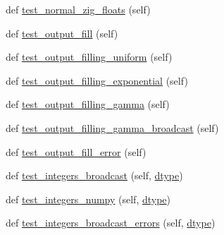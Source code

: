 \begin{DoxyCompactItemize}
\item 
def \hyperlink{classnumpy_1_1random_1_1tests_1_1test__smoke_1_1RNG_a7bd25c1252580282f6c5ece399b0b784}{test\+\_\+normal\+\_\+zig\+\_\+floats} (self)
\item 
def \hyperlink{classnumpy_1_1random_1_1tests_1_1test__smoke_1_1RNG_aa1c3a26ee79d7e545f382d4ed15c1aca}{test\+\_\+output\+\_\+fill} (self)
\item 
def \hyperlink{classnumpy_1_1random_1_1tests_1_1test__smoke_1_1RNG_af3fa4803063d64d41308b6ddb200aaed}{test\+\_\+output\+\_\+filling\+\_\+uniform} (self)
\item 
def \hyperlink{classnumpy_1_1random_1_1tests_1_1test__smoke_1_1RNG_a42b71b9eb4aa536fef0c938354656f14}{test\+\_\+output\+\_\+filling\+\_\+exponential} (self)
\item 
def \hyperlink{classnumpy_1_1random_1_1tests_1_1test__smoke_1_1RNG_aeca773dcb5fa1f20a9dd6421203189f2}{test\+\_\+output\+\_\+filling\+\_\+gamma} (self)
\item 
def \hyperlink{classnumpy_1_1random_1_1tests_1_1test__smoke_1_1RNG_a4b40b32c75ec60537cbb9a501b22d7ca}{test\+\_\+output\+\_\+filling\+\_\+gamma\+\_\+broadcast} (self)
\item 
def \hyperlink{classnumpy_1_1random_1_1tests_1_1test__smoke_1_1RNG_a193e526d27e4f6a41b785e3810577ca1}{test\+\_\+output\+\_\+fill\+\_\+error} (self)
\item 
def \hyperlink{classnumpy_1_1random_1_1tests_1_1test__smoke_1_1RNG_a7a28a76175a40979877678eb53a40052}{test\+\_\+integers\+\_\+broadcast} (self, \hyperlink{namespacenumpy_1_1random_1_1tests_1_1test__smoke_a9f08a7184be9d03413a436ef931b87c5}{dtype})
\item 
def \hyperlink{classnumpy_1_1random_1_1tests_1_1test__smoke_1_1RNG_a1e82ee17b54e66cdb3222ffd6566cb6f}{test\+\_\+integers\+\_\+numpy} (self, \hyperlink{namespacenumpy_1_1random_1_1tests_1_1test__smoke_a9f08a7184be9d03413a436ef931b87c5}{dtype})
\item 
def \hyperlink{classnumpy_1_1random_1_1tests_1_1test__smoke_1_1RNG_a31968256e6b4351de51f7a72021cbe43}{test\+\_\+integers\+\_\+broadcast\+\_\+errors} (self, \hyperlink{namespacenumpy_1_1random_1_1tests_1_1test__smoke_a9f08a7184be9d03413a436ef931b87c5}{dtype})
\end{DoxyCompactItemize}
